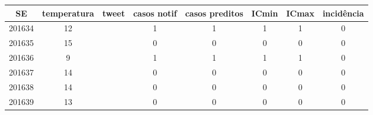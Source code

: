 \begin{tabular}{c|ccccccc}
  \hline
SE & temperatura & tweet & casos notif & casos preditos & ICmin & ICmax & incidência \\ 
  \hline
201634 & 12 &  & 1 & 1 & 1 & 1 & 0 \\ 
  201635 & 15 &  & 0 & 0 & 0 & 0 & 0 \\ 
  201636 & 9 &  & 1 & 1 & 1 & 1 & 0 \\ 
  201637 & 14 &  & 0 & 0 & 0 & 0 & 0 \\ 
  201638 & 14 &  & 0 & 0 & 0 & 0 & 0 \\ 
  201639 & 13 &  & 0 & 0 & 0 & 0 & 0 \\ 
   \hline
\end{tabular}
